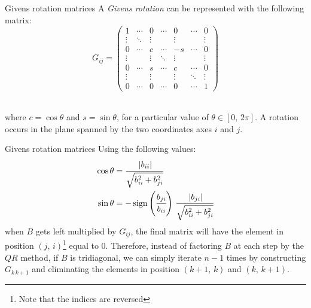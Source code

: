 \documentclass[10pt]{beamer}
\DeclareMathOperator{\sign}{sign}
\begin{document}
\begin{frame}{Givens rotation matrices}
    A \textit{Givens rotation} can be represented with the following matrix:
    $$
    G_{ij} =
    \begin{pmatrix}
        1 & \cdots & 0 & \cdots & 0 & \cdots & 0 \\
        \vdots & \ddots & \vdots & & \vdots & & \vdots \\
        0 & \cdots & c & \cdots & -s & \cdots & 0 \\
        \vdots & & \vdots & \ddots & \vdots & & \vdots \\
        0 & \cdots & s & \cdots & c & \cdots & 0 \\
        \vdots & & \vdots & & \vdots & \ddots & \vdots \\
        0 & \cdots & 0 & \cdots & 0 & \cdots & 1
    \end{pmatrix}
    $$ \\ \bigskip \bigskip

    where $c = \cos \theta$ and  $s = \sin \theta$, for a particular value of $ \theta \in [0, \, 2 \pi] $. \newline
    A rotation occurs in the plane spanned by the two coordinates axes $i$ and $j$.

\end{frame}

\begin{frame}{Givens rotation matrices}
    Using the following values:
    $$
    \begin{aligned}
        \cos \theta &=  \cfrac{\left\lvert b_{ii} \right\rvert}{ \sqrt{ b_{ii}^2 +   b_{ji}^2} } \\
        \sin \theta &= - \sign \left( \cfrac{ b_{ji} }{ b_{ii} } \right)   \, \cfrac{\left\lvert b_{ji} \right\rvert}{ \sqrt{ b_{ii}^2 +   b_{ji}^2} } \\
    \end{aligned}
    $$
    when $B$ gets left multiplied by $G_{ij}$, the final matrix will have the element in position $(j, \, i)$\footnote{Note that the indices are reversed} equal to $0$. \newline
    Therefore, instead of factoring $B$ at each step by the $QR$ method, if $B$ is tridiagonal, we can simply iterate $n - 1$ times by constructing $G_{k\,k+1}$ and eliminating the elements in position $(k+1, \, k)$ and $(k, \, k+1)$.
\end{frame}
\end{document}
